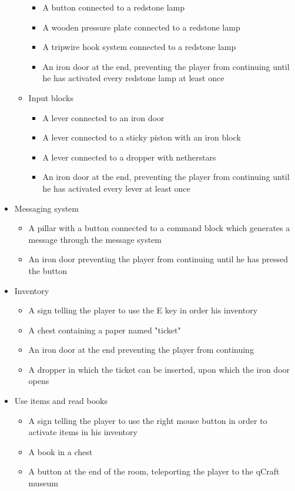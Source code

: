 \documentclass[11pt,twoside]{report} %
\begin{document}
\begin{itemize}
\begin{itemize}
\begin{itemize}
			\item A button connected to a redstone lamp
			\item A wooden pressure plate connected to a redstone lamp
			\item A tripwire hook system connected to a redstone lamp
			\item An iron door at the end, preventing the player from continuing until he has activated every redstone lamp at least once
		\end{itemize}
		\item Input blocks
		\begin{itemize}
			\item A lever connected to an iron door
			\item A lever connected to a sticky piston with an iron block
			\item A lever connected to a dropper with netherstars
			\item An iron door at the end, preventing the player from continuing until he has activated every lever at least once
		\end{itemize}
	\end{itemize}
	\item Messaging system
	\begin{itemize}
		\item A pillar with a button connected to a command block which generates a message through the message system
		\item An iron door preventing the player from continuing until he has pressed the button
	\end{itemize}
	\item Inventory
	\begin{itemize}
		\item A sign telling the player to use the E key in order his inventory
		\item A chest containing a paper named "ticket"
		\item An iron door at the end preventing the player from continuing
		\item A dropper in which the ticket can be inserted, upon which the iron door opens
	\end{itemize}
	\item Use items and read books
	\begin{itemize}
		\item A sign telling the player to use the right mouse button in order to activate items in his inventory
		\item A book in a chest
		\item A button at the end of the room, teleporting the player to the qCraft museum
	\end{itemize}
\end{itemize}
\end{document}
